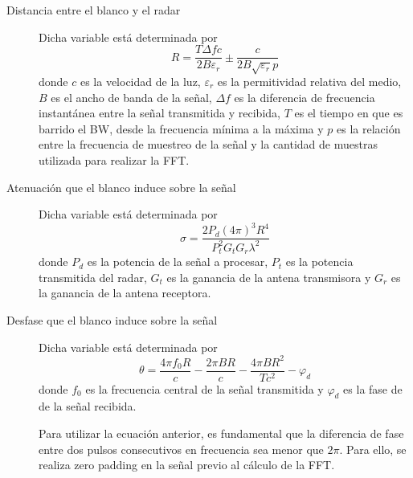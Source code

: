 \begin{description}

\item[Distancia entre el blanco y el radar]
Dicha variable está determinada por
\begin{equation}
  R = \dfrac{T\Delta fc}{2B\varepsilon_r} \pm \dfrac{c}{2B\sqrt{\varepsilon_r}p}
\end{equation}
donde $c$ es la velocidad de la luz, $\varepsilon_r$ es la permitividad relativa del medio, $B$ es el ancho de banda de la señal, $\Delta f$ es la diferencia de frecuencia instantánea entre la señal transmitida y recibida, $T$ es el tiempo en que es barrido el BW, desde la frecuencia mínima a la máxima y $p$ es la relación entre la frecuencia de muestreo de la señal y la cantidad de muestras utilizada para realizar la FFT.

\item[Atenuación que el blanco induce sobre la señal]
Dicha variable está determinada por
\begin{equation}
  \sigma = \dfrac{2P_d(4\pi)^3 R^4}{P_t^2G_tG_r\lambda^2}
\end{equation}
donde $P_d$ es la potencia de la señal a procesar, $P_t$ es la potencia transmitida del radar, $G_t$ es la ganancia de la antena transmisora y $G_r$ es la ganancia de la antena receptora.

\item[Desfase que el blanco induce sobre la señal]
Dicha variable está determinada por
\begin{equation}
  \theta = \dfrac{4\pi f_0R}{c} - \dfrac{2\pi BR}{c} - \dfrac{4\pi BR^2}{Tc^2} - \varphi_d
\end{equation}
donde $f_0$ es la frecuencia central de la señal transmitida y $\varphi_d$ es la fase de de la señal recibida.

Para utilizar la ecuación anterior, es fundamental que la diferencia de fase entre dos pulsos consecutivos en frecuencia sea menor que $2\pi$. Para ello, se realiza zero padding en la señal previo al cálculo de la FFT.
\end{description}
